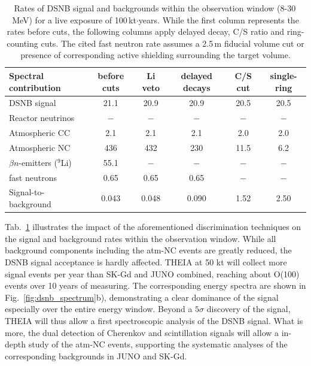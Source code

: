 \begin{table}[htp!]
\begin{center}
\begin{tabular}{lccccc}
\hline
Spectral contribution			& before cuts & Li veto & delayed decays & C/S cut & single-ring \\
\hline
DSNB signal				& 21.1	& 20.9	& 20.9	& 20.5	& 20.5\\
Reactor neutrinos			& $-$	& $-$ 	& $-$	& $-$	& $-$ \\
Atmospheric CC			& 2.1		& 2.1		& 2.1		& 2.0		& 2.0 \\
\hline
Atmospheric NC			& 436	& 432 	& 230	&11.5	& 6.2 \\
$\beta n$-emitters ($^9$Li)	& 55.1 	& $-$	& $-$	& $-$	& $-$ \\
fast neutrons				& 0.65 	& 0.65  	& 0.65	& $-$	& $-$ \\
\hline
Signal-to-background		& 0.043	& 0.048	& 0.090	& 1.52 	& 2.50  \\
\hline
\end{tabular}

\end{center}
\caption{Rates of DSNB signal and backgrounds within the observation window (8-30\,MeV) for a live exposure of 100\,kt$\cdot$years. While the first column represents the rates before cuts, the following columns apply delayed decay, C/S ratio and ring-counting cuts. The cited fast neutron rate assumes a 2.5\,m fiducial volume cut or presence of corresponding active shielding surrounding the target volume.}
\label{tab:dsnb_rates}
\end{table}

Tab.~\ref{tab:dsnb_rates} illustrates the impact of the aforementioned discrimination techniques on the signal and background rates within the observation window. While all background components including the atm-NC events are greatly reduced, the DSNB signal acceptance is hardly affected. THEIA at 50 kt will collect more signal events per year than SK-Gd and JUNO combined, reaching about {\cal O}(100) events over 10 years of measuring. The corresponding energy spectra are shown in Fig.~\ref{fig:dsnb_spectrum}b), demonstrating a clear dominance of the signal especially over the entire energy window. Beyond a $5\sigma$ discovery of the signal, THEIA will thus allow a first spectroscopic analysis of the DSNB signal. What is more, the dual detection of Cherenkov and scintillation signals will allow a in-depth study of the atm-NC events, supporting the systematic analyses of the corresponding backgrounds in JUNO and SK-Gd.

